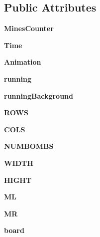 \subsection*{Public Attributes}
\begin{CompactItemize}
\item 
\textbf{Mines\-Counter}\label{classMinesweeper_1_1Minesweeper_64819d68065c693c148d02ab06de578f}

\item 
\textbf{Time}\label{classMinesweeper_1_1Minesweeper_524341d9d2976f44d0bc0d72d4b16764}

\item 
\textbf{Animation}\label{classMinesweeper_1_1Minesweeper_bf2ff9f6042c9082e3c2bb2cd5904251}

\item 
\textbf{running}\label{classMinesweeper_1_1Minesweeper_33b669be9c6b640fcddc046e0fb6f71a}

\item 
\textbf{running\-Background}\label{classMinesweeper_1_1Minesweeper_c7603d4ca7e0f271ef423e50da49c336}

\item 
\textbf{ROWS}\label{classMinesweeper_1_1Minesweeper_675108718fee9b7d625da713f81da4e5}

\item 
\textbf{COLS}\label{classMinesweeper_1_1Minesweeper_faeba00555703ccefc904e5752b89c5c}

\item 
\textbf{NUMBOMBS}\label{classMinesweeper_1_1Minesweeper_4c96b8949c772bd7e5f5b1948400615b}

\item 
\textbf{WIDTH}\label{classMinesweeper_1_1Minesweeper_8ed44c551c1ce100fd6ee7247ce4bc34}

\item 
\textbf{HIGHT}\label{classMinesweeper_1_1Minesweeper_8e4952f93d2214bebda4b812efdd55d1}

\item 
\textbf{ML}\label{classMinesweeper_1_1Minesweeper_b141431ab778debf665a48116881fab8}

\item 
\textbf{MR}\label{classMinesweeper_1_1Minesweeper_609fead17425ea31fdb085b472283dee}

\item 
\textbf{board}\label{classMinesweeper_1_1Minesweeper_87fcc6c15a08f54e5d31901bf0749fea}

\end{CompactItemize}


